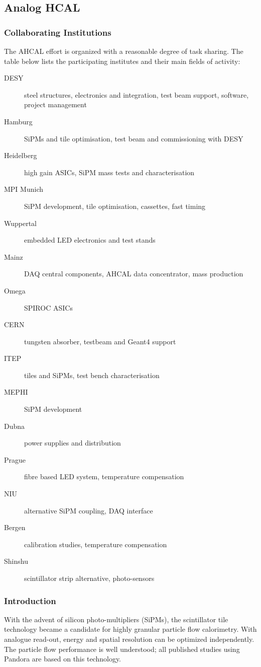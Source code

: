 \subsection{Analog HCAL}
\subsubsection{Collaborating Institutions}
The AHCAL effort is organized with a reasonable degree of task sharing. The table below lists the participating institutes and their main fields of activity:
\begin{description}
\item[DESY]   steel structures, electronics and integration, test beam support, software, project management
\item[Hamburg]    SiPMs and tile optimisation, test beam and commissioning with DESY 
\item[Heidelberg]     high gain ASICs, SiPM mass tests and characterisation  
\item[MPI Munich] SiPM development, tile optimisation, cassettes, fast timing
\item[Wuppertal]  embedded LED electronics and test stands
\item[Mainz]  DAQ central components, AHCAL data concentrator, mass production
\item[Omega]  SPIROC ASICs 
\item[CERN]   tungsten absorber, testbeam and Geant4 support 
\item[ITEP]       tiles and SiPMs, test bench characterisation
\item[MEPHI]  SiPM development
\item[Dubna]  power supplies and distribution 
\item[Prague]     fibre based LED system, temperature compensation 
\item[NIU]        alternative SiPM coupling, DAQ interface 
\item[Bergen]     calibration studies, temperature compensation
\item[Shinshu] scintillator strip alternative, photo-sensors
\end{description}
\subsubsection{Introduction}
With the advent of silicon photo-multipliers (SiPMs), the scintillator tile technology became a candidate for highly granular particle flow calorimetry. With analogue read-out, energy and spatial resolution can be optimized independently. The particle flow performance is well understood; all published studies using Pandora are based on this technology. 


